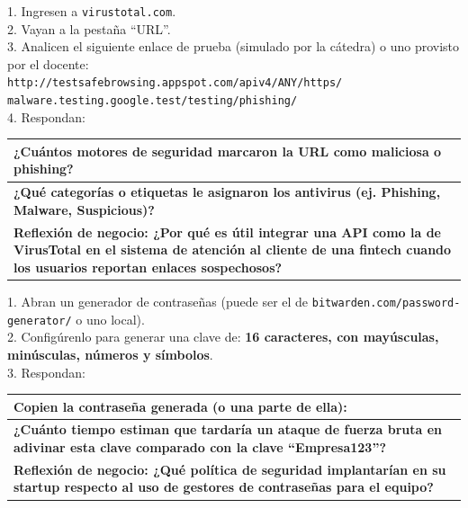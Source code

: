 \documentclass[12pt,a4paper]{article}
\renewcommand{\arraystretch}{1.25}
\begin{document}
\begin{cajaActividad}[title={Estaci\'on 2: El Esc\'aner (VirusTotal)}]
1. Ingresen a \texttt{virustotal.com}.\\
2. Vayan a la pesta\~na ``URL''.\\
3. Analicen el siguiente enlace de prueba (simulado por la c\'atedra) o uno provisto por el docente:\\
\texttt{http://testsafebrowsing.appspot.com/apiv4/ANY/https/}\\
\texttt{malware.testing.google.test/testing/phishing/}\\
4. Respondan:
\vspace{4pt}

\renewcommand{\arraystretch}{1.5}
\begin{tabularx}{\textwidth}{|X|}
\hline
\textbf{¿Cu\'antos motores de seguridad marcaron la URL como maliciosa o phishing?} \\[1.5cm]
\hline
\textbf{¿Qu\'e categor\'ias o etiquetas le asignaron los antivirus (ej. Phishing, Malware, Suspicious)?} \\[2cm]
\hline
\textbf{Reflexi\'on de negocio: ¿Por qu\'e es \'util integrar una API como la de VirusTotal en el sistema de atenci\'on al cliente de una fintech cuando los usuarios reportan enlaces sospechosos?} \\[2.5cm]
\hline
\end{tabularx}
\end{cajaActividad}

\vspace{8pt}

\begin{cajaActividad}[title={Estaci\'on 3: B\'oveda de Credenciales (Gestor)}]
1. Abran un generador de contrase\~nas (puede ser el de \texttt{bitwarden.com/password-generator/} o uno local).\\
2. Config\'urenlo para generar una clave de: \textbf{16 caracteres, con may\'usculas, min\'usculas, n\'umeros y s\'imbolos}.\\
3. Respondan:
\vspace{4pt}

\renewcommand{\arraystretch}{1.5}
\begin{tabularx}{\textwidth}{|X|}
\hline
\textbf{Copien la contrase\~na generada (o una parte de ella):} \\[1.5cm]
\hline
\textbf{¿Cu\'anto tiempo estiman que tardar\'ia un ataque de fuerza bruta en adivinar esta clave comparado con la clave ``Empresa123''?} \\[2cm]
\hline
\textbf{Reflexi\'on de negocio: ¿Qu\'e pol\'itica de seguridad implantar\'ian en su startup respecto al uso de gestores de contrase\~nas para el equipo?} \\[2.5cm]
\hline
\end{tabularx}
\end{cajaActividad}
\end{document}
